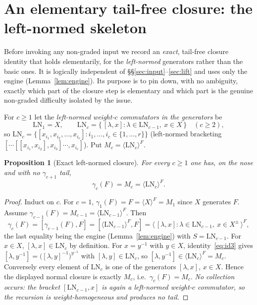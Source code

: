 \documentclass{amsart}
\newtheorem{proposition}{Proposition}
\theoremstyle{definition}
\theoremstyle{remark}
\begin{document}
\section{An elementary tail-free closure: the left-normed skeleton}\label{sec:leftnormed}

Before invoking any non-graded input we record an \emph{exact}, tail-free closure
identity that holds elementarily, for the \emph{left-normed} generators rather than
the basic ones. It is logically independent of \S\S\ref{sec:input}--\ref{sec:lift}
and uses only the engine (Lemma~\ref{lem:engine}). Its purpose is to pin down, with no
ambiguity, exactly which part of the closure step is elementary and which part is the
genuine non-graded difficulty isolated by the issue.

For $c\ge1$ let the \emph{left-normed weight-$c$ commutators in the generators} be
\[
\mathrm{LN}_1=X,\qquad
\mathrm{LN}_c=\{\,[\lambda,x] : \lambda\in\mathrm{LN}_{c-1},\ x\in X\,\}\quad(c\ge2),
\]
so $\mathrm{LN}_c=\{[x_{i_1},x_{i_2},\dots,x_{i_c}] : i_1,\dots,i_c\in\{1,\dots,r\}\}$
(left-normed bracketing $[\cdots[[x_{i_1},x_{i_2}],x_{i_3}]\cdots,x_{i_c}]$). Put
$M_c=\langle\mathrm{LN}_c\rangle^{F}$.

\begin{proposition}[Exact left-normed closure]\label{prop:leftnormed}
For every $c\ge1$ one has, \emph{on the nose and with no $\gamma_{c+1}$ tail},
\[
\gamma_c(F)=M_c=\langle\mathrm{LN}_c\rangle^{F}.
\]
\end{proposition}
\begin{proof}
Induct on $c$. For $c=1$, $\gamma_1(F)=F=\langle X\rangle^{F}=M_1$ since $X$ generates
$F$. Assume $\gamma_{c-1}(F)=M_{c-1}=\langle\mathrm{LN}_{c-1}\rangle^{F}$. Then
\[
\gamma_c(F)=[\gamma_{c-1}(F),F]=[\langle\mathrm{LN}_{c-1}\rangle^{F},F]
=\big\langle\,[\lambda,x] : \lambda\in\mathrm{LN}_{c-1},\ x\in X^{\pm}\,\big\rangle^{F},
\]
the last equality being the engine (Lemma~\ref{lem:engine}) with $S=\mathrm{LN}_{c-1}$.
For $x\in X$, $[\lambda,x]\in\mathrm{LN}_c$ by definition. For $x=y^{-1}$ with $y\in X$,
identity~\eqref{eq:id3} gives $[\lambda,y^{-1}]=\big([\lambda,y]^{-1}\big)^{y^{-1}}$ with
$[\lambda,y]\in\mathrm{LN}_c$, so $[\lambda,y^{-1}]\in\langle\mathrm{LN}_c\rangle^{F}=M_c$.
Conversely every element of $\mathrm{LN}_c$ is one of the generators $[\lambda,x]$,
$x\in X$. Hence the displayed normal closure is exactly $M_c$, i.e.\ $\gamma_c(F)=M_c$.
\emph{No collection occurs: the bracket $[\mathrm{LN}_{c-1},x]$ is again a left-normed
weight-$c$ commutator, so the recursion is weight-homogeneous and produces no tail.}
\end{proof}
\end{document}
